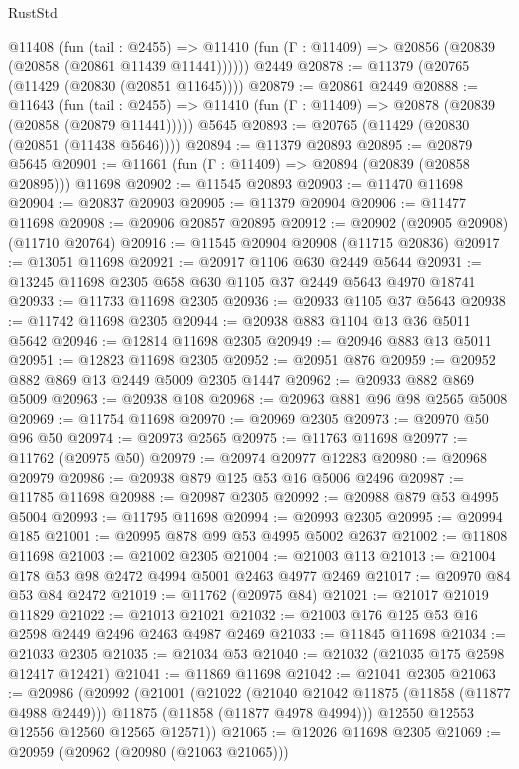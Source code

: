 \begin{lexlean}{RustStd}
\begin{coremodule}
    @11408
      (fun (tail : @2455) =>
      @11410 (fun (Γ : @11409) => @20856 (@20839 (@20858 (@20861 @11439 @11441))))))
    @2449
@20878 := @11379 (@20765 (@11429 (@20830 (@20851 @11645))))
@20879 := @20861 @2449
@20888 := @11643
    (fun (tail : @2455) => @11410 (fun (Γ : @11409) => @20878 (@20839 (@20858 (@20879 @11441)))))
    @5645
@20893 := @20765 (@11429 (@20830 (@20851 (@11438 @5646))))
@20894 := @11379 @20893
@20895 := @20879 @5645
@20901 := @11661 (fun (Γ : @11409) => @20894 (@20839 (@20858 @20895))) @11698
@20902 := @11545 @20893
@20903 := @11470 @11698
@20904 := @20837 @20903
@20905 := @11379 @20904
@20906 := @11477 @11698
@20908 := @20906 @20857 @20895
@20912 := @20902 (@20905 @20908) (@11710 @20764)
@20916 := @11545 @20904 @20908 (@11715 @20836)
@20917 := @13051 @11698
@20921 := @20917 @1106 @630 @2449 @5644
@20931 := @13245 @11698 @2305 @658 @630 @1105 @37 @2449 @5643 @4970 @18741
@20933 := @11733 @11698 @2305
@20936 := @20933 @1105 @37 @5643
@20938 := @11742 @11698 @2305
@20944 := @20938 @883 @1104 @13 @36 @5011 @5642
@20946 := @12814 @11698 @2305
@20949 := @20946 @883 @13 @5011
@20951 := @12823 @11698 @2305
@20952 := @20951 @876
@20959 := @20952 @882 @869 @13 @2449 @5009 @2305 @1447
@20962 := @20933 @882 @869 @5009
@20963 := @20938 @108
@20968 := @20963 @881 @96 @98 @2565 @5008
@20969 := @11754 @11698
@20970 := @20969 @2305
@20973 := @20970 @50 @96 @50
@20974 := @20973 @2565
@20975 := @11763 @11698
@20977 := @11762 (@20975 @50)
@20979 := @20974 @20977 @12283
@20980 := @20968 @20979
@20986 := @20938 @879 @125 @53 @16 @5006 @2496
@20987 := @11785 @11698
@20988 := @20987 @2305
@20992 := @20988 @879 @53 @4995 @5004
@20993 := @11795 @11698
@20994 := @20993 @2305
@20995 := @20994 @185
@21001 := @20995 @878 @99 @53 @4995 @5002 @2637
@21002 := @11808 @11698
@21003 := @21002 @2305
@21004 := @21003 @113
@21013 := @21004 @178 @53 @98 @2472 @4994 @5001 @2463 @4977 @2469
@21017 := @20970 @84 @53 @84 @2472
@21019 := @11762 (@20975 @84)
@21021 := @21017 @21019 @11829
@21022 := @21013 @21021
@21032 := @21003 @176 @125 @53 @16 @2598 @2449 @2496 @2463 @4987 @2469
@21033 := @11845 @11698
@21034 := @21033 @2305
@21035 := @21034 @53
@21040 := @21032 (@21035 @175 @2598 @12417 @12421)
@21041 := @11869 @11698
@21042 := @21041 @2305
@21063 := @20986
    (@20992
      (@21001
        (@21022
          (@21040 @21042 @11875 (@11858 (@11877 @4988 @2449)))
          @11875
          (@11858 (@11877 @4978 @4994)))
        @12550
        @12553
        @12556
        @12560
        @12565
        @12571))
@21065 := @12026 @11698 @2305
@21069 := @20959 (@20962 (@20980 (@21063 @21065)))

\end{coremodule}
\end{lexlean}
